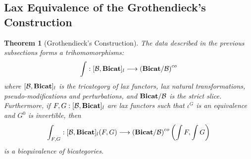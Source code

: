 \documentclass{article}
\numberwithin{equation}{section}
\theoremstyle{definition}
\theoremstyle{plain}
\newtheorem{theorem}[equation]{Theorem}
\newcommand{\Bicat}{\textnormal{\textbf{Bicat}}}
\begin{document}
\subsection{Lax Equivalence of the Grothendieck's Construction}

\begin{theorem}[Grothendieck's Construction] The data described in the previous subsections forms a trihomomorphisms:
	\[\int: [\mathcal{B}, \Bicat]_{l} \longrightarrow \left(\Bicat/\mathcal{B}\right)^{co}\]
	where $[\mathcal{B}, \Bicat]_{l}$ is the tricategory of lax functors, lax natural transformations, pseudo-modifications and perturbations, and $\Bicat/\mathcal{B}$ is the strict slice. Furthermore, if $F,G:[\mathcal{B}, \Bicat]_{l}$ are lax functors such that $\iota^G$ is an equivalence and $G^0$ is invertible, then
	\[\int_{F,G}: [\mathcal{B}, \Bicat]_{l}(F,G) \longrightarrow \left(\Bicat/\mathcal{B}\right)^{co}\left(\int F, \int G\right)\]
	is a biequivalence of bicategories.
\end{theorem}

\newpage


\end{document}
